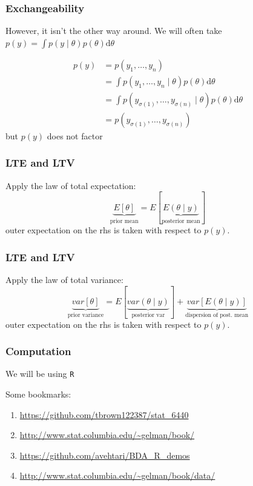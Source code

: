 \documentclass{beamer}
\begin{document}
\begin{frame}
\frametitle{Exchangeability}

However, it isn't the other way around. We will often take $p(y) = \int p(y \mid \theta) p(\theta) \text{d}\theta$

\begin{align*}
p(y) &= p(y_1, \ldots, y_n) \\
&= \int p(y_1, \ldots, y_n \mid \theta) p(\theta) \text{d}\theta \\
&= \int p(y_{\sigma(1)}, \ldots, y_{\sigma(n)} \mid \theta) p(\theta) \text{d}\theta \\
&= p(y_{\sigma(1)}, \ldots, y_{\sigma(n)})
\end{align*}
 but $p(y)$ does not factor

\end{frame}

\begin{frame}
\frametitle{LTE and LTV}

Apply the law of total expectation:
\[
\underbrace{E[\theta]}_{\text{prior mean}} = E[\underbrace{E(\theta \mid y)}_{\text{posterior mean}}]
\]
outer expectation on the rhs is taken with respect to $p(y)$.

\end{frame}

\begin{frame}
\frametitle{LTE and LTV}

Apply the law of total variance:
\[
\underbrace{var[\theta]}_{\text{prior variance}} = E[\underbrace{var(\theta \mid y)}_{\text{posterior var}}] + \underbrace{var[E(\theta \mid y)]}_{\text{dispersion of post. mean}}
\]
outer expectation on the rhs is taken with respect to $p(y)$.

\end{frame}

\begin{frame}
\frametitle{Computation}

We will be using \texttt{R}
\newline


Some bookmarks:
\begin{enumerate}
\item \url{https://github.com/tbrown122387/stat_6440} 
\item \url{http://www.stat.columbia.edu/~gelman/book/}
\item \url{https://github.com/avehtari/BDA_R_demos}
\item \url{http://www.stat.columbia.edu/~gelman/book/data/}
\end{enumerate}



\end{frame}
\end{document}

